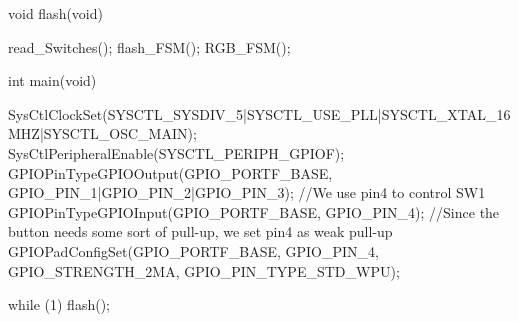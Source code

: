 \documentclass[12pt, a4paper]{article}
\begin{document}
\begin{code}
void flash(void) {
    read_Switches();
    flash_FSM();
    RGB_FSM();

}

int main(void)
{
    SysCtlClockSet(SYSCTL_SYSDIV_5|SYSCTL_USE_PLL|SYSCTL_XTAL_16MHZ|SYSCTL_OSC_MAIN);
        SysCtlPeripheralEnable(SYSCTL_PERIPH_GPIOF);
        GPIOPinTypeGPIOOutput(GPIO_PORTF_BASE, GPIO_PIN_1|GPIO_PIN_2|GPIO_PIN_3);
        //We use pin4 to control SW1
        GPIOPinTypeGPIOInput(GPIO_PORTF_BASE, GPIO_PIN_4);
        //Since the button needs some sort of pull-up, we set pin4 as weak pull-up
        GPIOPadConfigSet(GPIO_PORTF_BASE, GPIO_PIN_4, GPIO_STRENGTH_2MA, GPIO_PIN_TYPE_STD_WPU);

        while (1) {
            flash();
        }
}
\end{code}

\pagebreak
\end{document}
